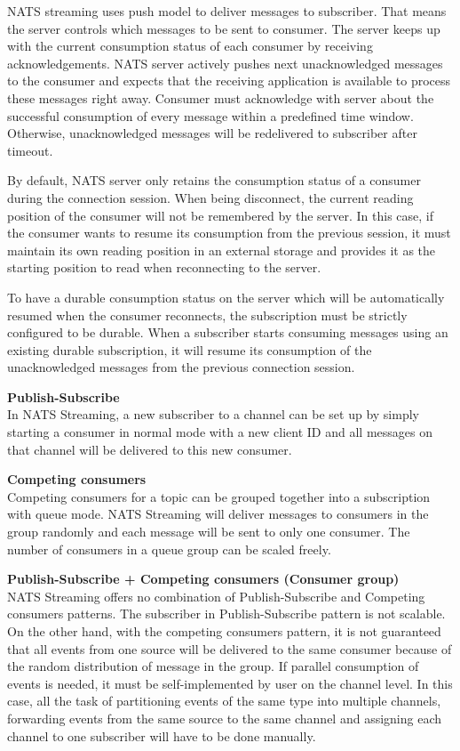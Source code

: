 NATS streaming uses push model to deliver messages to subscriber. That means the server controls which messages to be sent to consumer. The server keeps up with the current consumption status of each consumer by receiving acknowledgements. NATS server actively pushes next unacknowledged messages to the consumer and expects that the receiving application is available to process these messages right away. Consumer must acknowledge with server about the successful consumption of every message within a predefined time window. Otherwise, unacknowledged messages will be redelivered to subscriber after timeout. 
 
By default, NATS server only retains the consumption status of a consumer during the connection session. When being disconnect, the current reading position of the consumer will not be remembered by the server. In this case, if the consumer wants to resume its consumption from the previous session, it must maintain its own reading position in an external storage and provides it as the starting position to read when reconnecting to the server. 

To have a durable consumption status on the server which will be automatically resumed when the consumer reconnects, the subscription must be strictly configured to be durable. When a subscriber starts consuming messages using an existing durable subscription, it will resume its consumption of the unacknowledged messages from the previous connection session.

\textbf{Publish-Subscribe}\\
In NATS Streaming, a new subscriber to a channel can be set up by simply starting a consumer in normal mode with a new client ID and all messages on that channel will be delivered to this new consumer. 

\textbf{Competing consumers}\\
Competing consumers for a topic can be grouped together into a subscription with queue mode. NATS Streaming will deliver messages to consumers in the group randomly and each message will be sent to only one consumer. The number of consumers in a queue group can be scaled freely.

\textbf{Publish-Subscribe + Competing consumers (Consumer group)}\\
NATS Streaming offers no combination of Publish-Subscribe and Competing consumers patterns. The subscriber in Publish-Subscribe pattern is not scalable. On the other hand, with the competing consumers pattern, it is not guaranteed that all events from one source will be delivered to the same consumer because of the random distribution of message in the group. If parallel consumption of events is needed, it must be self-implemented by user on the channel level. In this case, all the task of partitioning events of the same type into multiple channels, forwarding events from the same source to the same channel and assigning each channel to one subscriber will have to be done manually.


